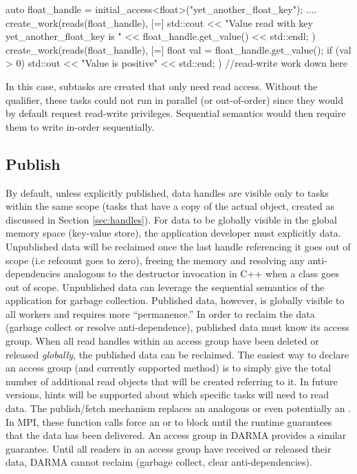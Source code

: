 \begin{CppCode}
auto float_handle = initial_access<float>("yet_another_float_key");
....
create_work(reads(float_handle), [=] {
  std::cout << "Value read with key yet_another_float_key is " 
          << float_handle.get_value() << std::endl;
})
create_work(reads(float_handle), [=] {
  float val = float_handle.get_value();
  if (val > 0) std::out << "Value is positive" << std::end;
})
//read-write work down here
\end{CppCode}
In this case, subtasks are created that only need read access. 
Without the  qualifier, these tasks could not run in parallel (or out-of-order) since they
would by default request read-write privileges.
Sequential semantics would then require them to write in-order sequentially.

\subsection{Publish}
\label{subsec:publish}
By default, unless explicitly published, data handles are visible only to tasks
within the same scope (tasks that have a copy of the actual
 object, created as discussed in
Section \ref{sec:handles}).
For data to be globally visible in the global memory space (key-value store),
the application developer must explicitly  data.  
Unpublished data will be reclaimed once the last handle referencing it goes out of scope (i.e refcount goes to zero),
freeing the memory and resolving any anti-dependencies analogous to the
destructor invocation in C++ when a class goes out of scope.  
Unpublished data can leverage the sequential semantics of the application for garbage collection.  
Published data, however, is globally visible to all workers and requires more ``permanence.''  
In order to reclaim the data (garbage collect or resolve anti-dependence), published data must know its access group.
When all read handles within an access group have been deleted or released \emph{globally}, the published data can be reclaimed.
The easiest way to declare an access group (and currently supported method) is
to simply give the total number of additional read  objects that will be created referring to it.
In future versions, hints will be supported about which specific tasks will need to read data.
The publish/fetch mechanism replaces an analogous  or even potentially an .
In MPI, these function calls force an  or  to block until the runtime guarantees that the data has been delivered.
An access group in DARMA provides a similar guarantee.
Until all readers in an access group have received or released their data, DARMA cannot reclaim (garbage collect, clear anti-dependencies).

